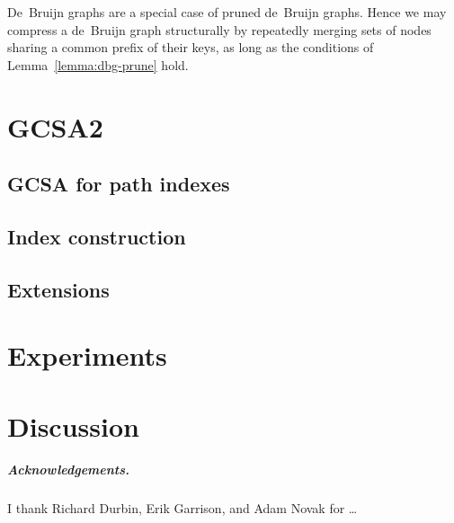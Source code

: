 \documentclass[a4paper,UKenglish]{lipics-v2016}
\begin{document}
De~Bruijn graphs are a special case of pruned de~Bruijn graphs. Hence we may compress a de~Bruijn graph structurally by repeatedly merging sets of nodes sharing a common prefix of their keys, as long as the conditions of Lemma~\ref{lemma:dbg-prune} hold.


\section{GCSA2}

\subsection{GCSA for path indexes}

\subsection{Index construction}

\subsection{Extensions}


\section{Experiments}


\section{Discussion}


\subparagraph*{Acknowledgements.}

I thank Richard Durbin, Erik Garrison, and Adam Novak for \dots



\end{document}
